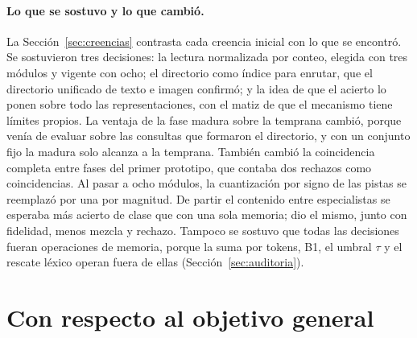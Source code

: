 \paragraph{Lo que se sostuvo y lo que cambió.}
La Sección~\ref{sec:creencias} contrasta cada creencia inicial con lo que se encontró.
Se sostuvieron tres decisiones: la lectura normalizada por conteo, elegida con tres
módulos y vigente con ocho; el directorio como índice para enrutar, que el directorio
unificado de texto e imagen confirmó; y la idea de que el acierto lo ponen sobre todo las
representaciones, con el matiz de que el mecanismo tiene límites propios.
La ventaja de la fase madura sobre la temprana cambió, porque venía de evaluar sobre las
consultas que formaron el directorio, y con un conjunto fijo la madura solo alcanza a la
temprana.
También cambió la coincidencia completa entre fases del primer prototipo, que contaba
dos rechazos como coincidencias.
Al pasar a ocho módulos, la cuantización por signo de las pistas se reemplazó por una por
magnitud.
De partir el contenido entre especialistas se esperaba más acierto de clase que con una
sola memoria; dio el mismo, junto con fidelidad, menos mezcla y rechazo.
Tampoco se sostuvo que todas las decisiones fueran operaciones de memoria, porque la suma
por tokens, B1, el umbral $\tau$ y el rescate léxico operan fuera de ellas
(Sección~\ref{sec:auditoria}).

\section{Con respecto al objetivo general}


